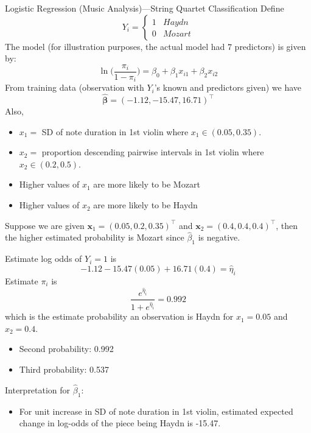 \begin{Example}{Logistic Regression (Music Analysis)---String Quartet Classification}{}
    Define
    \[ Y_i=\begin{cases*}
            1 & Haydn  \\
            0 & Mozart
        \end{cases*} \]
    The model (for illustration purposes, the actual model
    had $ 7 $ predictors) is given by:
    \[ \ln\biggl(\frac{\pi_i}{1-\pi_i}\biggr)=\beta_0+\beta_1x_{i1}+\beta_2x_{i2} \]
    From training data (observation with $ Y_i $'s known and predictors given)
    we have
    \[ \symbf{\hat{\beta}}=(-1.12,-15.47,16.71)^\top \]
    Also,
    \begin{itemize}
        \item $ x_1= $ SD of note duration in 1st violin
              where $ x_1\in(0.05, 0.35) $.
        \item $ x_2= $ proportion descending pairwise intervals
              in 1st violin
              where $ x_2\in(0.2,0.5) $.
    \end{itemize}
    \begin{itemize}
        \item Higher values of $ x_1 $ are more likely to be Mozart
        \item Higher values of $ x_2 $ are more likely to be Haydn
    \end{itemize}
    Suppose we are given
    $ \symbf{x}_1=(0.05,0.2,0.35)^\top $ and $ \symbf{x}_2=(0.4, 0.4, 0.4)^\top $,
    then the higher estimated probability is Mozart since $ \hat{\beta}_1 $
    is negative.

    Estimate log odds of $ Y_i=1 $ is
    \[ -1.12-15.47(0.05)+16.71(0.4)=\hat{\eta}_i \]
    Estimate $ \pi_i $ is
    \[ \frac{e^{\hat{\eta}_i}}{1+e^{\hat{\eta}_i}}=0.992  \]
    which is the estimate probability an observation
    is Haydn for $ x_1=0.05 $ and $ x_2=0.4 $.
    \begin{itemize}
        \item Second probability: 0.992
        \item Third probability: 0.537
    \end{itemize}
    Interpretation for $ \hat{\beta}_1 $:
    \begin{itemize}
        \item For unit increase in SD of note duration in 1st violin,
              estimated expected change in log-odds of the piece being Haydn
              is -15.47.
    \end{itemize}
\end{Example}
